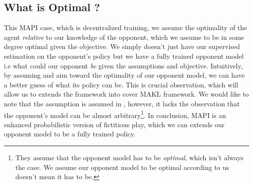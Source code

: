 \subsection{What is Optimal ?}
This MAPI case, which is decentralized training, we assume the optimality of the agent \textit{relative} to our knowledge of the opponent, which we assume to be in some degree optimal given the objective. We simply doesn't just have our supervised estimation on the opponent's policy but we have a fully trained opponent model i.e what could our opponent \textit{be} given the assumptions and objective. Intuitively, by assuming and aim toward the optimality of our opponent model, we can have a better guess of what its policy can be. This is crucial observation, which will allow us to extends the framework into cover MAKL framework. We would like to note that the assumption is assumed in \cite{tian2019regularized}, however, it lacks the observation that the opponent's model can be almost arbitrary\footnote{They assume that the opponent model has to be \textit{optimal}, which isn't always the case. We assume our opponent model to be optimal according to us doesn't mean it has to be.}. In conclusion, MAPI is an enhanced probabilistic version of fictitious play, which we can extends our opponent model to be a fully trained policy. 


